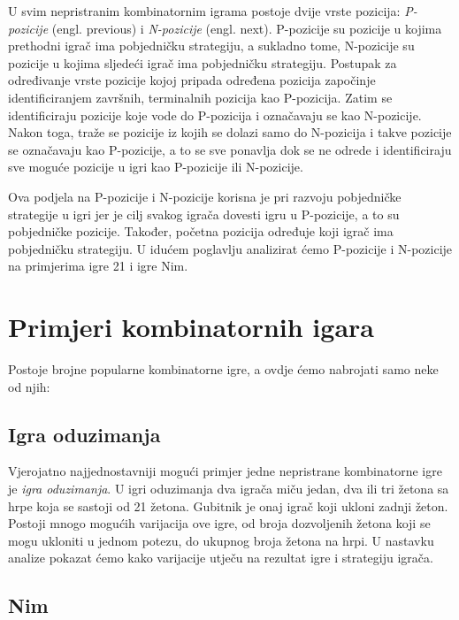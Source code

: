 U svim nepristranim kombinatornim igrama postoje dvije vrste pozicija: \textit{P-pozicije} (engl. previous) i \textit{N-pozicije} (engl. next). P-pozicije su pozicije u kojima prethodni igrač ima pobjedničku strategiju, a sukladno tome, N-pozicije su pozicije u kojima sljedeći igrač ima pobjedničku strategiju. Postupak za određivanje vrste pozicije kojoj pripada određena pozicija započinje identificiranjem završnih, terminalnih pozicija kao P-pozicija. Zatim se identificiraju pozicije koje vode do P-pozicija i označavaju se kao N-pozicije. Nakon toga, traže se pozicije iz kojih se dolazi samo do N-pozicija i takve pozicije se označavaju kao P-pozicije, a to se sve ponavlja dok se ne odrede i identificiraju sve moguće pozicije u igri kao P-pozicije ili N-pozicije.

Ova podjela na P-pozicije i N-pozicije korisna je pri razvoju pobjedničke strategije u igri jer je cilj svakog igrača dovesti igru u P-pozicije, a to su pobjedničke pozicije. Također, početna pozicija određuje koji igrač ima pobjedničku strategiju. U idućem poglavlju analizirat ćemo P-pozicije i N-pozicije na primjerima igre 21 i igre Nim. 



\section{Primjeri kombinatornih igara}

Postoje brojne popularne kombinatorne igre, a ovdje ćemo nabrojati samo neke od njih:

\subsection*{Igra oduzimanja}

Vjerojatno najjednostavniji mogući primjer jedne nepristrane kombinatorne igre je \textit{igra oduzimanja}. U igri oduzimanja dva igrača miču jedan, dva ili tri žetona sa hrpe koja se sastoji od 21 žetona. Gubitnik je onaj igrač koji ukloni zadnji žeton. Postoji mnogo mogućih varijacija ove igre, od broja dozvoljenih žetona koji se mogu ukloniti u jednom potezu, do ukupnog broja žetona na hrpi. U nastavku analize pokazat ćemo kako varijacije utječu na rezultat igre i strategiju igrača.



\subsection*{Nim}


